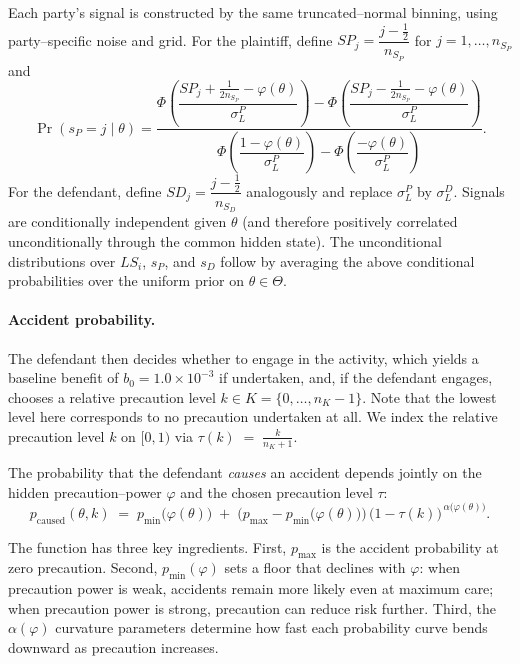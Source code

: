 \documentclass{article}
\begin{document}
Each party’s signal is constructed by the same truncated–normal binning, using party–specific noise and grid. For the plaintiff, define $SP_j=\dfrac{j-\tfrac12}{n_{S_P}}$ for $j=1,\dots,n_{S_P}$ and
\[
\Pr(s_P=j\mid \theta)
=
\frac{
\Phi\!\left(\dfrac{SP_j+\tfrac{1}{2n_{S_P}}-\varphi(\theta)}{\sigma_L^{P}}\right)
-
\Phi\!\left(\dfrac{SP_j-\tfrac{1}{2n_{S_P}}-\varphi(\theta)}{\sigma_L^{P}}\right)
}{
\Phi\!\left(\dfrac{1-\varphi(\theta)}{\sigma_L^{P}}\right)
-
\Phi\!\left(\dfrac{-\varphi(\theta)}{\sigma_L^{P}}\right)
}.
\]
For the defendant, define $SD_j=\dfrac{j-\tfrac12}{n_{S_D}}$ analogously and replace $\sigma_L^{P}$ by $\sigma_L^{D}$. Signals are conditionally independent given $\theta$ (and therefore positively correlated unconditionally through the common hidden state). The unconditional distributions over $LS_i$, $s_P$, and $s_D$ follow by averaging the above conditional probabilities over the uniform prior on $\theta\in\Theta$.

\paragraph{Accident probability.}

The defendant then decides whether to engage in the activity, which yields a baseline benefit of $b_0 = 1.0 \times 10^{-3}$ if undertaken, and, if the defendant engages, chooses a relative precaution level $k \in K = \{0,\dots,n_K-1\}$. Note that the lowest level here corresponds to no precaution undertaken at all. We index the relative precaution level $k$ on $[0,1)$ via $\tau(k) \;=\; \frac{k}{n_K + 1}$.

The probability that the defendant \emph{causes} an accident depends jointly on the hidden precaution–power $\varphi$ and the chosen precaution level $\tau$:
\begin{equation}
p_{\mathrm{caused}}(\theta,k)
\;=\;
p_{\min}\!\bigl(\varphi(\theta)\bigr)
\;+\;
\bigl(p_{\max}-p_{\min}\!\bigl(\varphi(\theta)\bigr)\bigr)\,
\bigl(1-\tau(k)\bigr)^{\,\alpha\!\bigl(\varphi(\theta)\bigr)}.
\label{eq:pcaused}
\end{equation}

The function has three key ingredients. First, $p_{\max}$ is the accident probability at zero precaution. Second, $p_{\min}(\varphi)$ sets a floor that declines with $\varphi$: when precaution power is weak, accidents remain more likely even at maximum care; when precaution power is strong, precaution can reduce risk further. Third, the  $\alpha(\varphi)$ curvature parameters determine how fast each probability curve bends downward as precaution increases.
\end{document}
